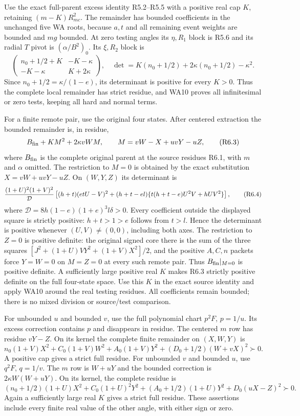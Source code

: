 Use the exact full-parent excess identity R5.2--R5.5 with a positive
real cap $K$, retaining $(m-K)R_{mc}^2$. The remainder has bounded
coefficients in the unchanged five WA roots, because $a,t$ and all
remaining event weights are bounded and $mg$ bounded. At zero testing
angles its $\eta,R_1$ block is R5.6 and its radial $T$ pivot is
$(\alpha/B^2)_0$. Its $\xi,R_2$ block is
\[
 \begin{pmatrix}n_0+1/2+K&-K-\kappa\\
                 -K-\kappa&K+2\kappa\end{pmatrix},
\quad\det=K(n_0+1/2)+2\kappa(n_0+1/2)-\kappa^2.     \tag{R6.2}
\]
Since $n_0+1/2=\kappa/(1-e)$, its determinant is positive for every
$K>0$. Thus the complete local remainder has strict residue, and WA10
proves all infinitesimal or zero tests, keeping all hard and normal terms.

For a finite remote pair, use the original four states. After centered
extraction the bounded remainder is, in residue,
\[
 B_{\rm fin}+K M^2+2\kappa vWM,\qquad
 M=vW-X+uvY-uZ,                                      \tag{R6.3}
\]
where $B_{\rm fin}$ is the complete original parent at the source
residues R6.1, with $m$ and $\alpha$ omitted. The restriction to
$M=0$ is obtained by the exact substitution $X=vW+uvY-uZ$.
On $(W,Y,Z)$ its determinant is
\[
 { (1+U)^2(1+V)^2\over\mathcal D}
 \left[(h+t)(etU-V)^2+(h+t-el)
          \{t(h+t-e)U^2V+hUV^2\}\right],             \tag{R6.4}
\]
where $\mathcal D=8h(1-e)(1+e)^3l\delta>0$.
Every coefficient outside the displayed square is strictly positive:
$h+t>1>e$ follows from $t>l$. Hence the determinant is positive
whenever $(U,V)\ne(0,0)$, including both axes. The restriction to
$Z=0$ is positive definite: the original signed core there is the sum
of the three squares
$[J^2+(1+U)VY^2+(1+V)X^2]/2$, and the positive $A,C,n$ packets
force $Y=W=0$ on $M=Z=0$ at every such remote pair.
Thus $B_{\rm fin}|_{M=0}$ is positive definite. A sufficiently large
positive real $K$ makes R6.3 strictly positive definite on the full
four-state space. Use this $K$ in the exact source identity and apply
WA10 around the real testing residues. All coefficients remain bounded;
there is no mixed division or source/test comparison.

For unbounded $u$ and bounded $v$, use the full polynomial chart
$p^2F$, $p=1/u$. Its excess correction contains $p$ and disappears in
residue. The centered $m$ row has residue $vY-Z$. On its kernel the
complete finite remainder on $(X,W,Y)$ is
\[
 n_0(1+V)X^2+C_0(1+V)W^2+A_0(1+V)Y^2
                                      +(D_0+1/2)(W+vX)^2\succ0.\tag{R6.5}
\]
A positive cap gives a strict full residue. For unbounded $v$ and bounded
$u$, use $q^2F$, $q=1/v$. The $m$ row is $W+uY$ and the bounded
correction is $2\kappa W(W+uY)$. On its kernel, the complete residue is
\[
 (n_0+1/2)(1+U)X^2+C_0(1+U)^2Y^2
             +(A_0+1/2)(1+U)Y^2+D_0(uX-Z)^2\succ0.  \tag{R6.6}
\]
Again a sufficiently large real $K$ gives a strict full residue.
These assertions include every finite real value of the other angle,
with either sign or zero.

